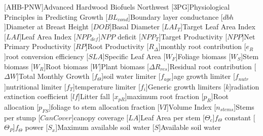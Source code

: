 \usepackage[printonlyused]{acronym}
[AHB-PNW]{Advanced Hardwood Biofuels Northwest}
[\textsc{3PG}]{Physiological Principles in Predicting Growth}
[\ensuremath{BL_{cond}}]{Boundary layer conductance}
[\ensuremath{dbh}]{Diameter at Breast Height}
[\ensuremath{DOB}]{Basal Diameter}
[\ensuremath{LAI_{T}}]{Target Leaf Area Index}
[\ensuremath{LAI}]{Leaf Area Index}
[\ensuremath{NPP_{def}}]{$NPP$ deficit}
[\ensuremath{NPP_{T}}]{Target Productivity}
[\ensuremath{NPP}]{Net Primary Productivity}
[\ensuremath{RP}]{Root Productivity}
[\ensuremath{R_{\Delta}}]{monthly root contribution}
[\ensuremath{e_{R}}]{root conversion efficiency}
[\ensuremath{SLA}]{Specific Leaf Area}
[\ensuremath{W_F}]{Foliage biomass}
[\ensuremath{W_S}]{Stem biomass}
[\ensuremath{W_R}]{Root biomass}
[\ensuremath{W}]{Plant biomass}
[\ensuremath{\Delta R_{res}}]{Residual root contribution}
[\ensuremath{\Delta W}]{Total Monthly Growth}
[\ensuremath{f_\Theta}]{soil water limiter}
[\ensuremath{f_{age}}]{age growth limiter}
[\ensuremath{f_{nutr}}]{nutritional limiter}
[\ensuremath{f_T}]{temperature limiter}
[\ensuremath{f_i}]{Generic growth limiters}
[\ensuremath{k}]{radiation extinction coefficient}
[\ensuremath{lf}]{Litter fall}
[\ensuremath{x_{pR}}]{maximum root fraction}
[\ensuremath{p_R}]{Root allocation}
[\ensuremath{p_{FS}}]{foliage to stem allocation fraction}
[\ensuremath{VI}]{Volume Index}
[\ensuremath{n_{stems}}]{Stems per stump}
[\ensuremath{CanCover}]{canopy coverage}
[\ensuremath{LA}]{Leaf Area per stem}
[\ensuremath{\Theta_{c}}]{$f_\Theta$ constant}
[\ensuremath{\Theta_{P}}]{$f_\Theta$ power}
[\ensuremath{S_x}]{Maximum available soil water}
[\ensuremath{S}]{Available soil water}

